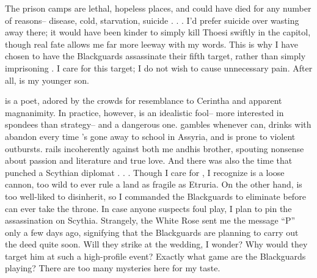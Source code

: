 \documentclass[char]{Kos}
\begin{document}
The prison camps are lethal, hopeless places, and \cFugitive{\they} could have died for any number of reasons-- disease, cold, starvation, suicide . . . I'd prefer suicide over wasting away there; it would have been kinder to simply kill Thoesi swiftly in the capitol, though \cFugitive{\their} real fate allows me far more leeway with my words. This is why I have chosen to have the Blackguards assassinate their fifth target, rather than simply imprisoning \cPoet{\them}. I care for this target; I do not wish to cause \cPoet{\them} unnecessary pain. After all, \cPoet{\they} is my younger son.

\cPoet{\They} is a poet, adored by the crowds for \cPoet{\their} resemblance to Cerintha and \cPoet{\their} apparent magnanimity. In practice, however, \cPoet{\they} is an idealistic fool-- more interested in spondees than strategy-- and a dangerous one. \cPoet{\They} gambles whenever \cPoet{\they} can, drinks with abandon every time \cPoet{\they}'s gone away to school in Assyria, and is prone to violent outbursts. \cPoet{\They} rails incoherently against both me and\cPoet{\their}his brother, spouting nonsense about passion and literature and true love. And there was also the time that \cPoet{\they} punched a Scythian diplomat . . . Though I care for \cPoet{\them}, I recognize \cPoet{\they} is a loose cannon, too wild to ever rule a land as fragile as Etruria. On the other hand, \cPoet{\they} is too well-liked to disinherit, so I commanded the Blackguards to eliminate \cPoet{\them} before \cPoet{\they} can ever take the throne. In case anyone suspects foul play, I plan to pin the assassination on Scythia. Strangely, the White Rose sent me the message ``P'' only a few days ago, signifying that the Blackguards are planning to carry out the deed quite soon. Will they strike at the wedding, I wonder? Why would they target him at such a high-profile event? Exactly what game are the Blackguards playing? There are too many mysteries here for my taste.
\end{document}
